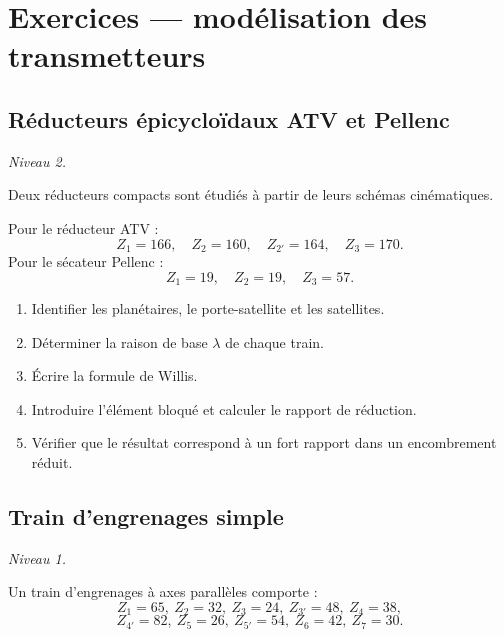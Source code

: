 
\section{Exercices — modélisation des transmetteurs}
\label{sec:ex-trans}

\subsection{Réducteurs épicycloïdaux ATV et Pellenc}

\textit{Niveau 2.}

Deux réducteurs compacts sont étudiés à partir de leurs schémas
cinématiques.

\begin{center}
\hfill
{}
\end{center}

Pour le réducteur ATV :
\[
Z_1=166,\quad Z_2=160,\quad Z_{2'}=164,\quad Z_3=170.
\]
Pour le sécateur Pellenc :
\[
Z_1=19,\quad Z_2=19,\quad Z_3=57.
\]

\begin{enumerate}
  \item Identifier les planétaires, le porte-satellite et les satellites.
  \item Déterminer la raison de base $\lambda$ de chaque train.
  \item Écrire la formule de Willis.
  \item Introduire l'élément bloqué et calculer le rapport de réduction.
  \item Vérifier que le résultat correspond à un fort rapport dans un encombrement réduit.
\end{enumerate}

\subsection{Train d'engrenages simple}

\textit{Niveau 1.}

Un train d'engrenages à axes parallèles comporte :
\[
Z_1=65,\ Z_2=32,\ Z_3=24,\ Z_{3'}=48,\ Z_4=38,
\]
\[
Z_{4'}=82,\ Z_5=26,\ Z_{5'}=54,\ Z_6=42,\ Z_7=30.
\]


